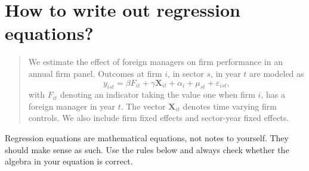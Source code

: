 \documentclass[12pt,a4paper]{article}
\begin{document}
\section{How to write out regression equations?}

\begin{quote}
We estimate the effect of foreign managers on firm performance in an annual firm panel. Outcomes at firm $i$, in sector $s$, in year $t$ are modeled as
\begin{equation}
	y_{ist} = \beta F_{it} + \gamma \mathbf X_{it} + \alpha_i + \mu_{st} + \varepsilon_{ist},
\end{equation}
with $F_{it}$ denoting an indicator taking the value one when firm $i$, has a foreign manager in year $t$. The vector $\mathbf X_{it}$ denotes time varying firm controls. We also include firm fixed effects and sector-year fixed effects.
\end{quote}

Regression equations are mathematical equations, not notes to yourself. They should make sense as such. Use the rules below and always check whether the algebra in your equation is correct.
\end{document}
